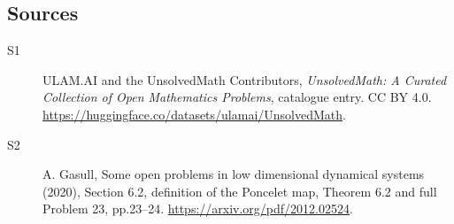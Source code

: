 \documentclass[11pt]{article}
\begin{document}
\subsection{Sources}
\begin{description}
\item[\hypertarget{source:statement:1}{S1}] ULAM.AI and the UnsolvedMath Contributors, \emph{UnsolvedMath: A Curated Collection of Open Mathematics Problems}, catalogue entry. CC BY 4.0. \url{https://huggingface.co/datasets/ulamai/UnsolvedMath}.
\item[\hypertarget{source:statement:2}{S2}] A. Gasull, Some open problems in low dimensional dynamical systems (2020), Section 6.2, definition of the Poncelet map, Theorem 6.2 and full Problem 23, pp.23--24. \url{https://arxiv.org/pdf/2012.02524}.
\end{description}
\label{end:statement}
\end{document}
